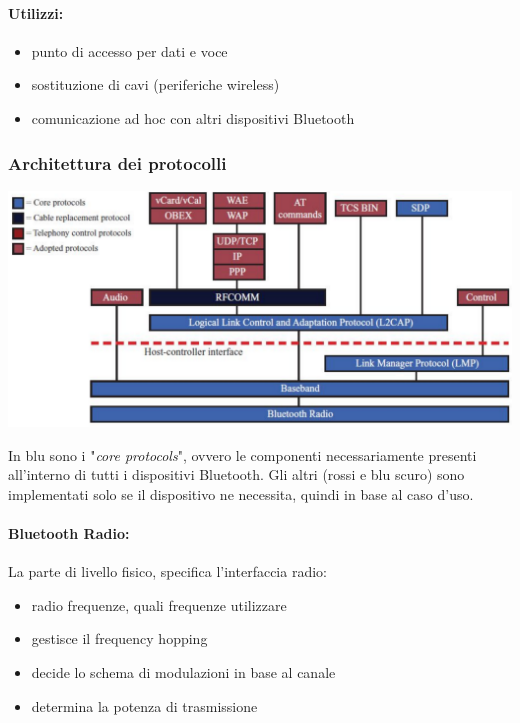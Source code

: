 \paragraph{Utilizzi:}
\begin{itemize}
	\item punto di accesso per dati e voce

	\item sostituzione di cavi (periferiche wireless)

	\item comunicazione ad hoc con altri dispositivi Bluetooth
\end{itemize}

\subsubsection{Architettura dei protocolli} 

\begin{center}
	\includegraphics[width=0.95\linewidth]{img/wpan/archbt}
\end{center}

In blu sono i "\textit{core protocols}", ovvero le componenti necessariamente presenti all'interno di tutti i dispositivi Bluetooth. Gli altri (rossi e blu scuro) sono implementati solo se il dispositivo ne necessita, quindi in base al caso d'uso.

\paragraph{Bluetooth Radio:} La parte di livello fisico, specifica l'interfaccia radio: 
\begin{itemize}
	\item radio frequenze, quali frequenze utilizzare
	
    \item gestisce il frequency hopping
	
    \item decide lo schema di modulazioni in base al canale
	
    \item determina la potenza di trasmissione
\end{itemize}

